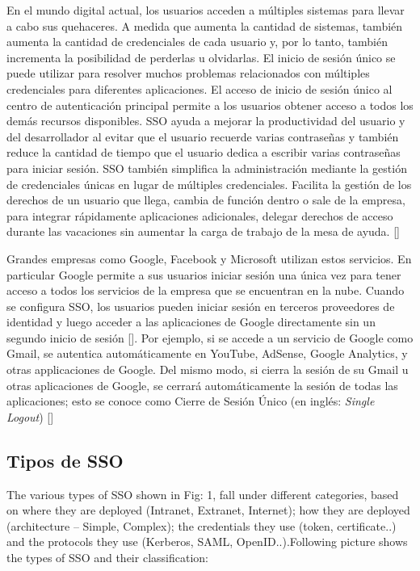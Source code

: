En el mundo digital actual, los usuarios acceden a múltiples sistemas para llevar a cabo sus quehaceres. A medida que aumenta la cantidad de sistemas, también aumenta la cantidad de credenciales de cada usuario y, por lo tanto, también incrementa la posibilidad de perderlas u olvidarlas. El inicio de sesión único se puede utilizar para resolver muchos problemas relacionados con múltiples credenciales para diferentes aplicaciones. El acceso de inicio de sesión único al centro de autenticación principal permite a los usuarios obtener acceso a todos los demás recursos disponibles. SSO ayuda a mejorar la productividad del usuario y del desarrollador al evitar que el usuario recuerde varias contraseñas y también reduce la cantidad de tiempo que el usuario dedica a escribir varias contraseñas para iniciar sesión. SSO también simplifica la administración mediante la gestión de credenciales únicas en lugar de múltiples credenciales. Facilita la gestión de los derechos de un usuario que llega, cambia de función dentro o sale de la empresa, para integrar rápidamente aplicaciones adicionales, delegar derechos de acceso durante las vacaciones sin aumentar la carga de trabajo de la mesa de ayuda. [\cite{radha2012survey}]

Grandes empresas como Google, Facebook y Microsoft utilizan estos servicios. En particular Google permite a sus usuarios iniciar sesión una única vez para tener acceso a todos los servicios de la empresa que se encuentran en la nube. Cuando se configura SSO, los usuarios pueden iniciar sesión en terceros proveedores de identidad y luego acceder a las aplicaciones de Google directamente sin un segundo inicio de sesión [\cite{google-support}]. Por ejemplo, si se accede a un servicio de Google como Gmail, se autentica automáticamente en YouTube, AdSense, Google Analytics, y otras applicaciones de Google. Del mismo modo, si cierra la sesión de su Gmail u otras aplicaciones de Google, se cerrará automáticamente la sesión de todas las aplicaciones; esto se conoce como Cierre de Sesión Único (en inglés: \textit{Single Logout}) [\cite{sso-doc}]

\subsection{Tipos de SSO}
The various types of SSO shown in Fig: 1, fall under different categories, based on where they are deployed (Intranet, Extranet, Internet); how they are deployed (architecture – Simple, Complex); the credentials they use (token, certificate..) and the protocols they use (Kerberos, SAML, OpenID..).Following picture shows the types of SSO and their classification: 

